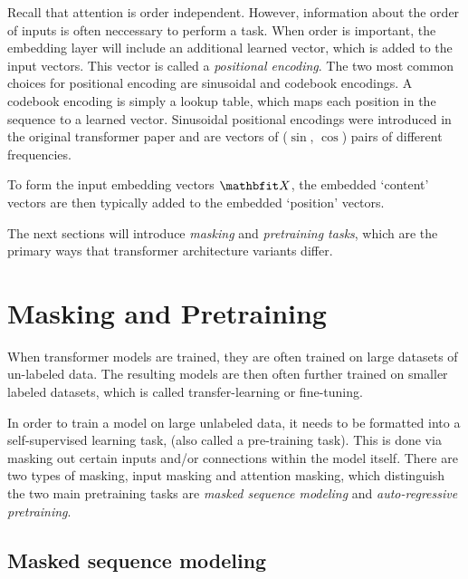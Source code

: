 Recall that attention is order independent. However, information about the order of inputs is often neccessary to perform a task. When order is important, the embedding layer will include an additional learned vector, which is added to the input vectors. This vector is called a \textit{positional encoding}. The two most common choices for positional encoding are sinusoidal and codebook encodings. A codebook encoding is simply a lookup table, which maps each position in the sequence to a learned vector. Sinusoidal positional encodings were introduced in the original transformer paper \cite{attention-is-all-you-need} and are vectors of ($\sin$, $\cos$) pairs of different frequencies.

To form the input embedding vectors $\X$, the embedded `content' vectors are then typically added to the embedded `position' vectors.

The next sections will introduce \textit{masking} and \textit{pretraining tasks}, which are the primary ways that transformer architecture variants differ.

\section{Masking and Pretraining}
\label{s:masking}

When transformer models are trained, they are often trained on large datasets of un-labeled data. The resulting models are then often further trained on smaller labeled datasets, which is called transfer-learning or fine-tuning.

In order to train a model on large unlabeled data, it needs to be formatted into a self-supervised learning task, (also called a pre-training task). This is done via masking out certain inputs and/or connections within the model itself. There are two types of masking, input masking and attention masking, which distinguish the two main pretraining tasks are \textit{masked sequence modeling} and \textit{auto-regressive pretraining}.

\subsection{Masked sequence modeling}
\label{ss:msm}

